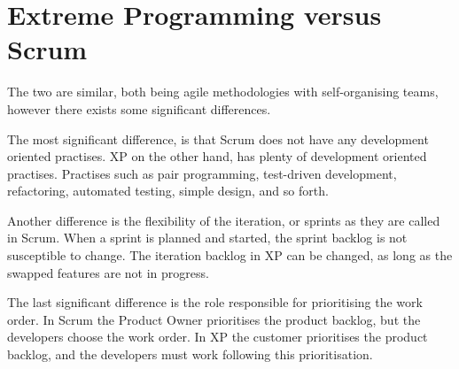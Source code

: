 \section{Extreme Programming versus Scrum}
The two are similar, both being agile methodologies with self-organising teams, however there exists some significant differences.

The most significant difference, is that Scrum does not have any development oriented practises.
XP on the other hand, has plenty of development oriented practises. Practises such as pair programming, test-driven development, refactoring, automated testing, simple design, and so forth.

Another difference is the flexibility of the iteration, or sprints as they are called in Scrum.
When a sprint is planned and started, the sprint backlog is not susceptible to change.
The iteration backlog in XP can be changed, as long as the swapped features are not in progress.

The last significant difference is the role responsible for prioritising the work order.
In Scrum the Product Owner prioritises the product backlog, but the developers choose the work order.
In XP the customer prioritises the product backlog, and the developers must work following this prioritisation. 

